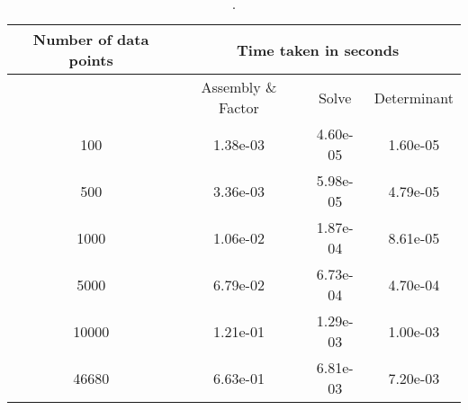 
\begin{table}[!htbp]
\begin{center}
\caption{.}
\begin{tabular}{|c|c|c|c|}
\hline
Number of data points & \multicolumn{3}{|c|}{Time taken in seconds} \\
\hline
 & Assembly \& Factor & Solve & Determinant \\

\hline
100 & 1.38e-03 & 4.60e-05 & 1.60e-05 \\\hline
500 & 3.36e-03 & 5.98e-05 & 4.79e-05 \\\hline
1000 & 1.06e-02 & 1.87e-04 & 8.61e-05 \\\hline
5000 & 6.79e-02 & 6.73e-04 & 4.70e-04 \\\hline
10000 & 1.21e-01 & 1.29e-03 & 1.00e-03 \\\hline
46680 & 6.63e-01 & 6.81e-03 & 7.20e-03 \\\hline
\end{tabular}
\end{center}
\end{table}
